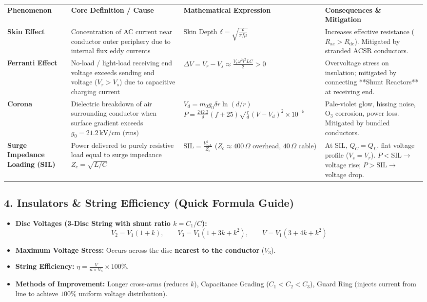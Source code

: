 \documentclass[10pt,a4paper]{article}
\begin{document}
\begin{center}
\scriptsize
\begin{tabularx}{\textwidth}{L{2.5cm} L{3.8cm} L{4.5cm} X}
  \color{white}\textbf{Phenomenon} & \color{white}\textbf{Core Definition / Cause} & \color{white}\textbf{Mathematical Expression} & \color{white}\textbf{Consequences \& Mitigation} \\
   \textbf{Skin Effect} & Concentration of AC current near conductor outer periphery due to internal flux eddy currents & Skin Depth $\delta = \sqrt{\frac{\rho}{\pi f \mu}}$ & Increases effective resistance ($R_{\text{ac}} > R_{\text{dc}}$). Mitigated by stranded ACSR conductors. \\
  \textbf{Ferranti Effect} & No-load / light-load receiving end voltage exceeds sending end voltage ($V_r > V_s$) due to capacitive charging current & $\Delta V = V_r - V_s \approx \frac{V_r \omega^2 l^2 L C}{2} > 0$ & Overvoltage stress on insulation; mitigated by connecting **Shunt Reactors** at receiving end. \\
   \textbf{Corona} & Dielectric breakdown of air surrounding conductor when surface gradient exceeds $g_0 = 21.2\,\text{kV/cm (rms)}$ & $V_d = m_0 g_0 \delta r \ln(d/r)$ \newline $P = \frac{242.2}{\delta}(f+25)\sqrt{\frac{r}{d}}(V-V_d)^2 \times 10^{-5}$ & Pale-violet glow, hissing noise, $\text{O}_3$ corrosion, power loss. Mitigated by bundled conductors. \\
  \textbf{Surge Impedance Loading (SIL)} & Power delivered to purely resistive load equal to surge impedance $Z_c = \sqrt{L/C}$ & $\text{SIL} = \frac{V_{\text{L-L}}^2}{Z_c}$ \newline ($Z_c \approx 400\,\Omega$ overhead, $40\,\Omega$ cable) & At SIL, $Q_C = Q_L$, flat voltage profile ($V_s = V_r$). $P < \text{SIL} \to$ voltage rise; $P > \text{SIL} \to$ voltage drop. \\
\end{tabularx}
\end{center}

\subsection{4. Insulators \& String Efficiency (Quick Formula Guide)}
\begin{itemize}
  \item \textbf{Disc Voltages (3-Disc String with shunt ratio $k = C_1 / C$):}
    \begin{equation*}
      V_2 = V_1 (1 + k), \qquad V_3 = V_1 (1 + 3k + k^2), \qquad V = V_1 (3 + 4k + k^2)
    \end{equation*}
  \item \textbf{Maximum Voltage Stress:} Occurs across the disc \textbf{nearest to the conductor} ($V_3$).
  \item \textbf{String Efficiency:} $\eta = \frac{V}{n \times V_n} \times 100\%$.
  \item \textbf{Methods of Improvement:} Longer cross-arms (reduces $k$), Capacitance Grading ($C_1 < C_2 < C_3$), Guard Ring (injects current from line to achieve $100\%$ uniform voltage distribution).
\end{itemize}
\end{document}
